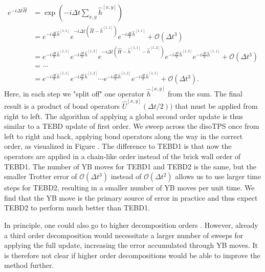 \begin{equation}
	\begin{split}
		\label{eq:disoTPS_tebd_second_order_suzuki_trotter_decomposition}
		e^{-i\Delta t\hat{H}} &= \exp\left(-i\Delta t\sum_{x,y}\hat{h}^{[x,y]}\right) \\
		&= e^{-i\frac{\Delta t}{2}\hat{h}^{[1, 1]}} e^{-i\Delta t\left(\hat{H}-\hat{h}^{[1,1]}\right)} e^{-i\frac{\Delta t}{2}\hat{h}^{[1, 1]}} + \mathcal{O}(\Delta t^3)\\
		&= e^{-i\frac{\Delta t}{2}\hat{h}^{[1, 1]}} e^{-i\frac{\Delta t}{2}\hat{h}^{[1, 2]}} e^{-i\Delta t\left(\hat{H}-\hat{h}^{[1,1]}-\hat{h}^{[1, 2]}\right)} e^{-i\frac{\Delta t}{2}\hat{h}^{[1, 2]}} e^{-i\frac{\Delta t}{2}\hat{h}^{[1, 1]}} + \mathcal{O}(\Delta t^3)\\
		&=\cdots\\
		&= e^{-i\frac{\Delta t}{2}\hat{h}^{[1, 1]}} e^{-i\frac{\Delta t}{2}\hat{h}^{[1, 2]}} \cdots e^{-i\frac{\Delta t}{2}\hat{h}^{[1, 2]}} e^{-i\frac{\Delta t}{2}\hat{h}^{[1, 1]}} + \mathcal{O}(\Delta t^3).
	\end{split}
\end{equation}
Here, in each step we "split off" one operator $\hat{h}^{[x,y]}$ from the sum. The final result is a product of bond operators $\hat{U}^{[x,y]}(\Delta t/2))$ that must be applied from right to left. The algorithm of applying a global second order update is thus similar to a TEBD update of first order. We sweep across the disoTPS once from left to right and back, applying bond operators along the way in the correct order, as visualized in Figure . The difference to TEBD1 is that now the operators are applied in a chain-like order instead of the brick wall order of TEBD1. The number of YB moves for TEBD1 and TEBD2 is the same, but the smaller Trotter error of $\mathcal{O}(\Delta t^3)$ instead of $\mathcal{O}(\Delta t^2)$ allows us to use larger time steps for TEBD2, resulting in a smaller number of YB moves per unit time. We find that the YB move is the primary source of error in practice and thus expect TEBD2 to perform much better than TEBD1. \par 
In principle, one could also go to higher decomposition orders \cite{cite:finding_exponential_product_formulas_of_higher_orders}. However, already a third order decomposition would necessitate a larger number of sweeps for applying the full update, increasing the error accumulated through YB moves. It is therefore not clear if higher order decompositions would be able to improve the method further.
